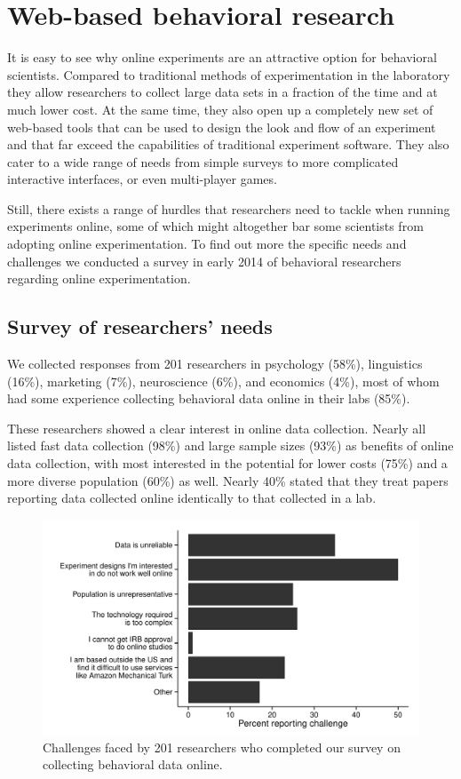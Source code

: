 \documentclass[twocolumn]{svjour3}          %
\begin{document}
\section{Web-based behavioral research}
It is easy to see why online experiments are an attractive option for behavioral scientists.
Compared to traditional methods of experimentation in the laboratory
they allow researchers to collect large data sets in a fraction of the time and at much lower cost.
At the same time, they also open up a completely new set of web-based tools that  can be used to
design the look and flow of an experiment and that far exceed the capabilities
of traditional experiment software.
They also cater to a wide range of needs from simple surveys to more complicated interactive interfaces,
 or even multi-player games.

Still, there exists a range of hurdles that researchers need to tackle when running experiments
online, some of which might altogether bar some scientists from adopting online experimentation.
 To find out more the specific needs and challenges we conducted a survey in early 2014 of behavioral 
 researchers regarding online experimentation. 

\subsection{Survey of researchers' needs}
 We collected responses from 201 researchers in psychology (58\%),
linguistics (16\%), marketing (7\%), neuroscience (6\%), and economics (4\%), most of whom had some
experience collecting behavioral data online in their labs (85\%).

These researchers showed a clear interest in online data collection. Nearly all listed fast data
collection (98\%) and large sample sizes (93\%) as benefits of online data collection, with most
interested in the potential for lower costs (75\%) and a more diverse population (60\%) as well. Nearly
40\% stated that they treat papers reporting data collected online identically to that collected in
a lab.

\begin{figure}[tp]
\centering
\includegraphics[scale=.75]{figures/challenges.pdf}
\caption{Challenges faced by 201 researchers who completed our survey on collecting behavioral data online.}
\label{fig:challenges}
\end{figure}
\end{document}
